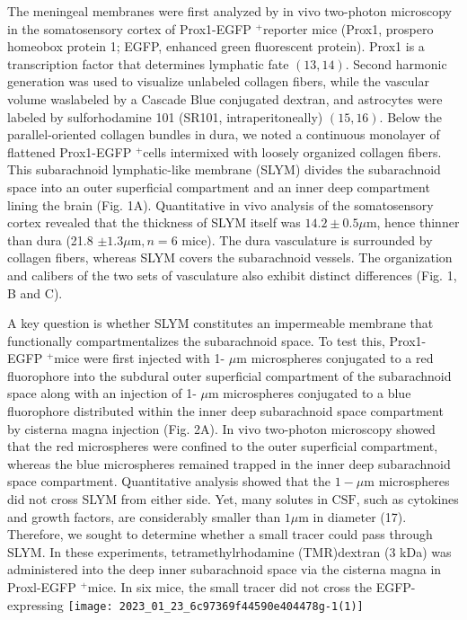 The meningeal membranes were first analyzed by in vivo two-photon microscopy in the somatosensory cortex of Prox1-EGFP ${ }^{+}$reporter mice (Prox1, prospero homeobox protein 1; EGFP, enhanced green fluorescent protein). Prox1 is a transcription factor that determines lymphatic fate $(13,14)$. Second harmonic generation was used to visualize unlabeled collagen fibers, while the vascular volume waslabeled by a Cascade Blue conjugated dextran, and astrocytes were labeled by sulforhodamine 101 (SR101, intraperitoneally) $(15,16)$. Below the parallel-oriented collagen bundles in dura, we noted a continuous monolayer of flattened Prox1-EGFP ${ }^{+}$cells intermixed with loosely organized collagen fibers. This subarachnoid lymphatic-like membrane (SLYM) divides the subarachnoid space into an outer superficial compartment and an inner deep compartment lining the brain (Fig. 1A). Quantitative in vivo analysis of the somatosensory cortex revealed that the thickness of SLYM itself was $14.2 \pm 0.5 \mu \mathrm{m}$, hence thinner than dura (21.8 $\pm 1.3 \mu \mathrm{m}, n=6$ mice). The dura vasculature is surrounded by collagen fibers, whereas SLYM covers the subarachnoid vessels. The organization and calibers of the two sets of vasculature also exhibit distinct differences (Fig. 1, B and C).

A key question is whether SLYM constitutes an impermeable membrane that functionally compartmentalizes the subarachnoid space. To test this, Prox1-EGFP ${ }^{+}$mice were first injected with 1- $\mu \mathrm{m}$ microspheres conjugated to a red fluorophore into the subdural outer superficial compartment of the subarachnoid space along with an injection of 1- $\mu \mathrm{m}$ microspheres conjugated to a blue fluorophore distributed within the inner deep subarachnoid space compartment by cisterna magna injection (Fig. 2A). In vivo two-photon microscopy showed that the red microspheres were confined to the outer superficial compartment, whereas the blue microspheres remained trapped in the inner deep subarachnoid space compartment. Quantitative analysis showed that the $1-\mu \mathrm{m}$ microspheres did not cross SLYM from either side. Yet, many solutes in $\mathrm{CSF}$, such as cytokines and growth factors, are considerably smaller than $1 \mu \mathrm{m}$ in diameter (17). Therefore, we sought to determine whether a small tracer could pass through SLYM. In these experiments, tetramethylrhodamine (TMR)dextran (3 kDa) was administered into the deep inner subarachnoid space via the cisterna magna in Proxl-EGFP ${ }^{+}$mice. In six mice, the small tracer did not cross the EGFP-expressing
\texttt{[image: 2023\_01\_23\_6c97369f44590e404478g-1(1)]}

